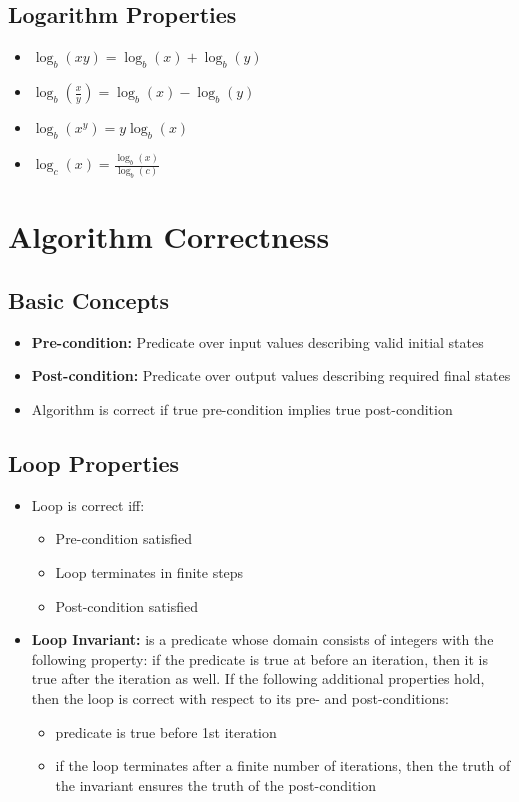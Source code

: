 \documentclass[8pt,landscape]{article}
\begin{document}
\begin{multicols*}{4}
		\subsection*{Logarithm Properties}
		\begin{itemize}[leftmargin=*]
			\item $\log_b(xy) = \log_b(x) + \log_b(y)$
			\item $\log_b(\frac{x}{y}) = \log_b(x) - \log_b(y)$
			\item $\log_b(x^y) = y\log_b(x)$
			\item $\log_c(x) = \frac{\log_b(x)}{\log_b(c)}$
		\end{itemize}
		\section*{Algorithm Correctness}
		
		\subsection*{Basic Concepts}
		\begin{itemize}[leftmargin=*]
			\item \textbf{Pre-condition:} Predicate over input values describing valid initial states
			\item \textbf{Post-condition:} Predicate over output values describing required final states
			\item Algorithm is correct if true pre-condition implies true post-condition
		\end{itemize}
		
		\subsection*{Loop Properties}
		\begin{itemize}[leftmargin=*]
			\item Loop is correct iff:
			\begin{itemize}
				\item Pre-condition satisfied
				\item Loop terminates in finite steps
				\item Post-condition satisfied
			\end{itemize}
			\item \textbf{Loop Invariant:}  is a predicate whose domain consists of integers with the following property: if the
			predicate is true at before an iteration, then it is true after the iteration as well. If the following additional
			properties hold, then the loop is correct with respect to its pre- and post-conditions:
			\begin{itemize}
				\item predicate is true before 1st iteration
				\item if the loop terminates after a finite number of iterations, then the truth of the invariant ensures the truth of the post-condition
			\end{itemize}
		\end{itemize}
		

\end{multicols*}
\end{document}
